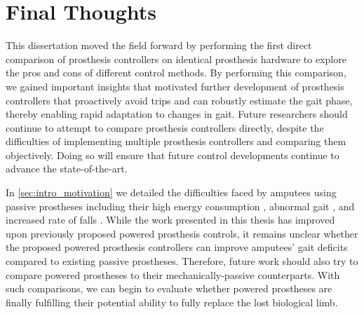 \section{Final Thoughts}

This dissertation moved the field forward by performing the first direct
comparison of prosthesis controllers on identical prosthesis hardware to explore
the pros and cons of different control methods. By performing this comparison,
we gained important insights that motivated further development of prosthesis
controllers that proactively avoid trips and can robustly estimate the gait
phase, thereby enabling rapid adaptation to changes in gait. Future researchers
should continue to attempt to compare prosthesis controllers directly, despite
the difficulties of implementing multiple prosthesis controllers and comparing
them objectively. Doing so will ensure that future control developments
continue to advance the state-of-the-art. 

In \cref{sec:intro_motivation} we detailed the difficulties faced by amputees
using passive prostheses including their high energy consumption
\citep{waters1976energy}, abnormal gait \citep{jaegers1995prosthetic}, and
increased rate of falls \citep{miller2001prevalence}. While the work presented
in this thesis has improved upon previously proposed powered prosthesis
controls, it remains unclear whether the proposed powered prosthesis controllers
can improve amputees' gait deficits compared to existing passive prostheses.
Therefore, future work should also try to compare powered prostheses to their
mechanically-passive counterparts. With such comparisons, we can begin to
evaluate whether powered prostheses are finally fulfilling their potential
ability to fully replace the lost biological limb.
